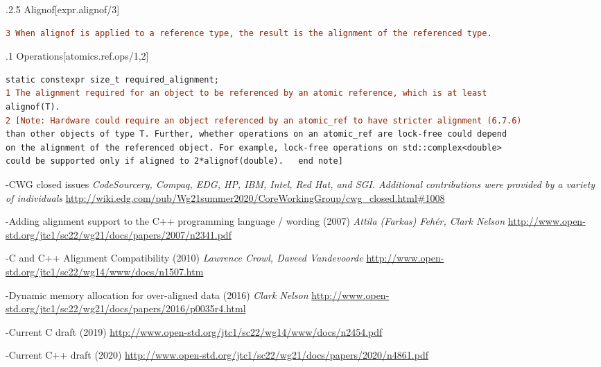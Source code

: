 \documentclass[11pt]{article}
\begin{document}
\begin{thebibliography}{5}
   \hypertarget{7.6.2.5/3}{}   
    .2.5 Alignof\hspace*{0pt}\hfill [expr.alignof/3]
    \newline
    \begin{lstlisting}[language=diff]
3 When alignof is applied to a reference type, the result is the alignment of the referenced type.
    \end{lstlisting}
    
    \hypertarget{31.7.1/1,2}{}   
    .1 Operations\hspace*{0pt}\hfill [atomics.ref.ops/1,2]
    \newline
    \begin{lstlisting}[language=diff]
static constexpr size_t required_alignment;
1 The alignment required for an object to be referenced by an atomic reference, which is at least
alignof(T).
2 [Note: Hardware could require an object referenced by an atomic_ref to have stricter alignment (6.7.6)
than other objects of type T. Further, whether operations on an atomic_ref are lock-free could depend
on the alignment of the referenced object. For example, lock-free operations on std::complex<double>
could be supported only if aligned to 2*alignof(double).   end note]
    \end{lstlisting}

    
    \hypertarget{CWGtopic}{}\bibitem[9]-CWG closed issues
    \emph{CodeSourcery, Compaq, EDG, HP, IBM, Intel, Red Hat, and SGI. Additional contributions were provided by a variety of individuals}\newline
    \url{ http://wiki.edg.com/pub/Wg21summer2020/CoreWorkingGroup/cwg_closed.html#1008}
    
    \hypertarget{AlignmentCpp}{}\bibitem[10]-Adding alignment support to the C++ programming language / wording (2007)
    \emph{Attila (Farkas) Fehér, Clark Nelson}\newline
    \url{http://www.open-std.org/jtc1/sc22/wg21/docs/papers/2007/n2341.pdf}
    
    \hypertarget{CAndCppAlignment}{}\bibitem[11]-C and C++ Alignment Compatibility (2010)
    \emph{Lawrence Crowl, Daveed Vandevoorde}\newline
    \url{http://www.open-std.org/jtc1/sc22/wg14/www/docs/n1507.htm}
    
    \hypertarget{DynamicAlignment}{}\bibitem[12]-Dynamic memory allocation for over-aligned data (2016)
    \emph{Clark Nelson}\newline
    \url{http://www.open-std.org/jtc1/sc22/wg21/docs/papers/2016/p0035r4.html}
    
    \hypertarget{CStandard}{}\bibitem[13]-Current C draft (2019)
    \emph{}\newline
    \url{http://www.open-std.org/jtc1/sc22/wg14/www/docs/n2454.pdf}

    \hypertarget{CppStandard}{}\bibitem[14]-Current C++ draft (2020)
    \emph{}\newline
    \url{http://www.open-std.org/jtc1/sc22/wg21/docs/papers/2020/n4861.pdf}

\end{thebibliography}
\end{document}
